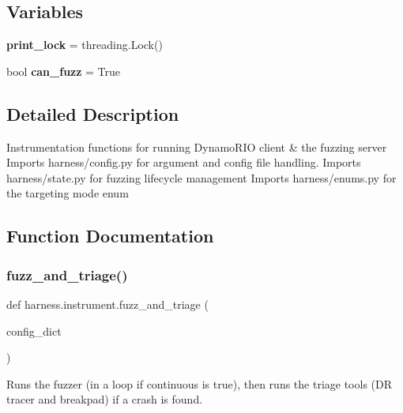 \subsection*{Variables}
\begin{DoxyCompactItemize}
\item 
\mbox{\label{namespaceharness_1_1instrument_a54da41ab26868762f3f61cd60eadeb10}} 
{\bfseries print\+\_\+lock} = threading.\+Lock()
\item 
\mbox{\label{namespaceharness_1_1instrument_a0f445df3317f413a786bf5bccecd3026}} 
bool {\bfseries can\+\_\+fuzz} = True
\end{DoxyCompactItemize}


\subsection{Detailed Description}
\begin{DoxyVerb}Instrumentation functions for running DynamoRIO client & the fuzzing server
Imports harness/config.py for argument and config file handling.
Imports harness/state.py for fuzzing lifecycle management
Imports harness/enums.py for the targeting mode enum
\end{DoxyVerb}
 

\subsection{Function Documentation}
\mbox{\label{namespaceharness_1_1instrument_ab4d1c49a240e5857d912c00e526a4167}} 
\subsubsection{\texorpdfstring{fuzz\+\_\+and\+\_\+triage()}{fuzz\_and\_triage()}}
{\footnotesize\ttfamily def harness.\+instrument.\+fuzz\+\_\+and\+\_\+triage (\begin{DoxyParamCaption}\item[{}]{config\+\_\+dict }\end{DoxyParamCaption})}

\begin{DoxyVerb}Runs the fuzzer (in a loop if continuous is true), then runs the triage
tools (DR tracer and breakpad) if a crash is found.
\end{DoxyVerb}
 \mbox{\label{namespaceharness_1_1instrument_a3eb5109ad7e514685a2ac0f83ca2b0f3}} 
